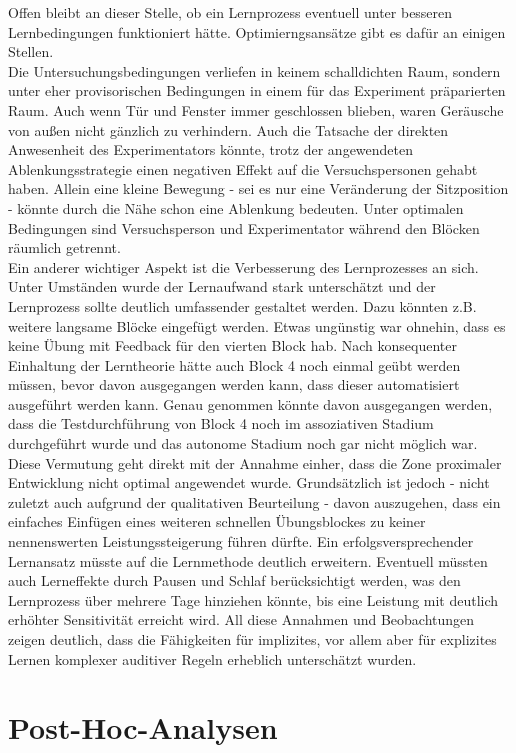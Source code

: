 \documentclass[doc,a4paper,12pt]{apa6}
\begin{document}
Offen bleibt an dieser Stelle, ob ein Lernprozess eventuell unter besseren Lernbedingungen funktioniert hätte. Optimierngsansätze gibt es dafür an einigen Stellen.\\
Die Untersuchungsbedingungen verliefen in keinem schalldichten Raum, sondern unter eher provisorischen Bedingungen in einem für das Experiment präparierten Raum. Auch wenn Tür und Fenster immer geschlossen blieben, waren Geräusche von außen nicht gänzlich zu verhindern. Auch die Tatsache der direkten Anwesenheit des Experimentators könnte, trotz der angewendeten Ablenkungsstrategie einen negativen Effekt auf die Versuchspersonen gehabt haben. Allein eine kleine Bewegung - sei es nur eine Veränderung der Sitzposition - könnte durch die Nähe schon eine Ablenkung bedeuten. Unter optimalen Bedingungen sind Versuchsperson und Experimentator während den Blöcken räumlich getrennt.\\
Ein anderer wichtiger Aspekt ist die Verbesserung des Lernprozesses an sich. Unter Umständen wurde der Lernaufwand stark unterschätzt und der Lernprozess sollte deutlich umfassender gestaltet werden. Dazu könnten z.B. weitere langsame Blöcke eingefügt werden. Etwas ungünstig war ohnehin, dass es keine Übung mit Feedback für den vierten Block hab. Nach konsequenter Einhaltung der Lerntheorie hätte auch Block 4 noch einmal geübt werden müssen, bevor davon ausgegangen werden kann, dass dieser automatisiert ausgeführt werden kann. Genau genommen könnte davon ausgegangen werden, dass die Testdurchführung von Block 4 noch im assoziativen Stadium durchgeführt wurde und das autonome Stadium noch gar nicht möglich war. Diese Vermutung geht direkt mit der Annahme einher, dass die Zone proximaler Entwicklung nicht optimal angewendet wurde. Grundsätzlich ist jedoch - nicht zuletzt auch aufgrund der qualitativen Beurteilung - davon auszugehen, dass ein einfaches Einfügen eines weiteren schnellen Übungsblockes zu keiner nennenswerten Leistungssteigerung führen dürfte. Ein erfolgsversprechender Lernansatz müsste auf die Lernmethode deutlich erweitern. Eventuell müssten auch Lerneffekte durch Pausen und Schlaf berücksichtigt werden, was den Lernprozess über mehrere Tage hinziehen könnte, bis eine Leistung mit deutlich erhöhter Sensitivität erreicht wird. All diese Annahmen und Beobachtungen zeigen deutlich, dass die Fähigkeiten für implizites, vor allem aber für explizites Lernen komplexer auditiver Regeln erheblich unterschätzt wurden.


\section{Post-Hoc-Analysen}
\end{document}
